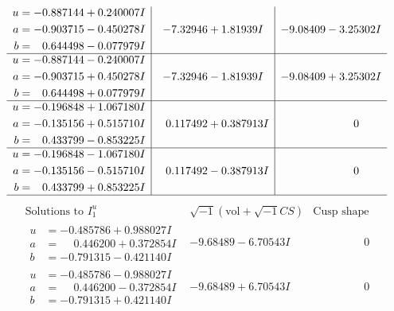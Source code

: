 \documentclass[1p]{elsarticle_modified}
\theoremstyle{definition}
\newcommand{\I}{\sqrt{-1}}
\begin{document}
$$\begin{array}{c|c|c}
\begin{aligned}
u &= -0.887144 + 0.240007 I \\
a &= -0.903715 - 0.450278 I \\
b &= \phantom{-}0.644498 - 0.077979 I\end{aligned}
 & -7.32946 + 1.81939 I & -9.08409 - 3.25302 I \\ \hline\begin{aligned}
u &= -0.887144 - 0.240007 I \\
a &= -0.903715 + 0.450278 I \\
b &= \phantom{-}0.644498 + 0.077979 I\end{aligned}
 & -7.32946 - 1.81939 I & -9.08409 + 3.25302 I \\ \hline\begin{aligned}
u &= -0.196848 + 1.067180 I \\
a &= -0.135156 + 0.515710 I \\
b &= \phantom{-}0.433799 - 0.853225 I\end{aligned}
 & \phantom{-}0.117492 + 0.387913 I & \phantom{-0.000000 } 0 \\ \hline\begin{aligned}
u &= -0.196848 - 1.067180 I \\
a &= -0.135156 - 0.515710 I \\
b &= \phantom{-}0.433799 + 0.853225 I\end{aligned}
 & \phantom{-}0.117492 - 0.387913 I & \phantom{-0.000000 } 0\\
 \hline 
 \end{array}$$\newpage$$\begin{array}{c|c|c}  
\text{Solutions to }I^u_{1}& \I (\text{vol} + \sqrt{-1}CS) & \text{Cusp shape}\\
 \hline 
\begin{aligned}
u &= -0.485786 + 0.988027 I \\
a &= \phantom{-}0.446200 + 0.372854 I \\
b &= -0.791315 - 0.421140 I\end{aligned}
 & -9.68489 - 6.70543 I & \phantom{-0.000000 } 0 \\ \hline\begin{aligned}
u &= -0.485786 - 0.988027 I \\
a &= \phantom{-}0.446200 - 0.372854 I \\
b &= -0.791315 + 0.421140 I\end{aligned}
 & -9.68489 + 6.70543 I & \phantom{-0.000000 } 0 \\ \hline\begin{aligned}

\end{aligned}
\end{array}$$
\end{document}
